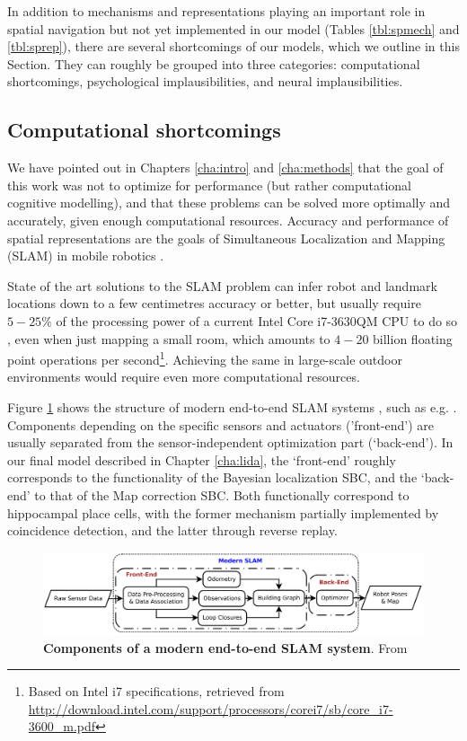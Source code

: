 In addition to mechanisms and representations playing an important role in spatial navigation but not yet implemented in our model (Tables \ref{tbl:spmech} and \ref{tbl:sprep}), there are several shortcomings of our models, which we outline in this Section. They can roughly be grouped into three categories: computational shortcomings, psychological implausibilities, and neural implausibilities.

\subsection{Computational shortcomings}

We have pointed out in Chapters \ref{cha:intro} and \ref{cha:methods} that the goal of this work was not to optimize for performance (but rather computational cognitive modelling), and that these problems can be solved more optimally and accurately, given enough computational resources. Accuracy and performance of spatial representations are the goals of Simultaneous Localization and Mapping (SLAM) in mobile robotics \citep{thrun2008simultaneous}. 

State of the art solutions to the SLAM problem can infer robot and landmark locations down to a few centimetres accuracy or better, but usually require $5-25 \%$ of the processing power of a current Intel Core i7-3630QM CPU to do so \citep{machado2013evaluation}, even when just mapping a small room, which amounts to $4-20$ billion floating point operations per second\footnote{Based on Intel i7 specifications, retrieved from  \url{http://download.intel.com/support/processors/corei7/sb/core_i7-3600_m.pdf}}. Achieving the same in large-scale outdoor environments would require even more computational resources.

Figure \ref{fig:endtoendslam} shows the structure of modern end-to-end SLAM systems \citep{wang2015}, such as e.g. \citep{newman2011describing}. Components depending on the specific sensors and actuators ('front-end') are usually separated from the sensor-independent optimization part (`back-end'). In our final model described in Chapter \ref{cha:lida}, the `front-end' roughly corresponds to the functionality of the Bayesian localization SBC, and the `back-end' to that of the Map correction SBC. Both functionally correspond to hippocampal place cells, with the former mechanism partially implemented by coincidence detection, and the latter through reverse replay. 

\begin{figure}[h]
	\centering
	\includegraphics[width=\textwidth]{img/endtoendslam}
	\caption[Components of a modern end-to-end SLAM system]{\textbf{Components of a modern end-to-end SLAM system}. From \citep{wang2015}} 
	\label{fig:endtoendslam}
\end{figure}

